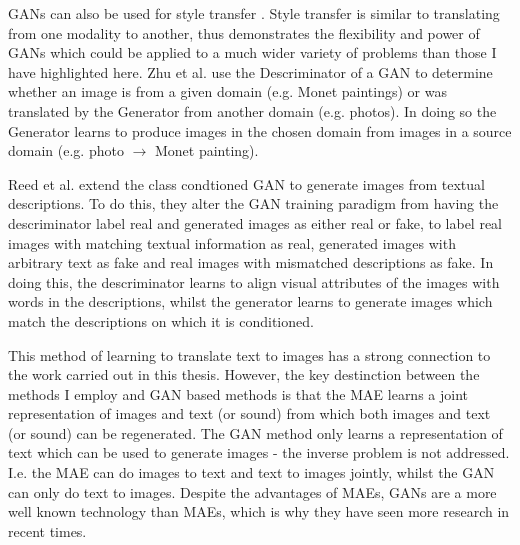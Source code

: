 \acp{GAN} can also be used for style transfer \cite{zhu2017unpaired}. Style transfer is similar to translating from one modality to another, thus \cite{zhu2017unpaired} demonstrates the flexibility and power of \acp{GAN} which could be applied to a much wider variety of problems than those I have highlighted here. Zhu et al. use the Descriminator of a \ac{GAN} to determine whether an image is from a given domain (e.g. Monet paintings) or was translated by the Generator from another domain (e.g. photos). In doing so the Generator learns to produce images in the chosen domain from images in a source domain (e.g. photo $\rightarrow$ Monet painting).

Reed et al. \cite{reed2016generative} extend the class condtioned \ac{GAN} to generate images from textual descriptions. To do this, they alter the \ac{GAN} training paradigm from having the descriminator label real and generated images as either real or fake, to label real images with matching textual information as real, generated images with arbitrary text as fake and real images with mismatched descriptions as fake. In doing this, the descriminator learns to align visual attributes of the images with words in the descriptions, whilst the generator learns to generate images which match the descriptions on which it is conditioned. 

This method of learning to translate text to images has a strong connection to the work carried out in this thesis. However, the key destinction between the methods I employ and \ac{GAN} based methods is that the \ac{MAE} learns a joint representation of images and text (or sound) from which both images and text (or sound) can be regenerated. The \ac{GAN} method only learns a representation of text which can be used to generate images - the inverse problem is not addressed. I.e. the \ac{MAE} can do images to text and text to images jointly, whilst the \ac{GAN} can only do text to images. Despite the advantages of \acp{MAE}, \acp{GAN} are a more well known technology than \acp{MAE}, which is why they have seen more research in recent times.

